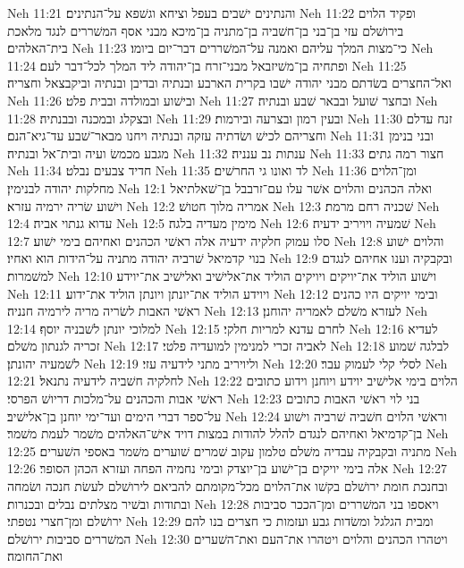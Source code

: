 Neh 11:21  והנתינים ישׁבים בעפל וציחא וגשׁפא על־הנתינים׃
Neh 11:22  ופקיד הלוים בירושׁלם עזי בן־בני בן־חשׁביה בן־מתניה בן־מיכא מבני אסף המשׁררים לנגד מלאכת בית־האלהים׃
Neh 11:23  כי־מצות המלך עליהם ואמנה על־המשׁררים דבר־יום ביומו׃
Neh 11:24  ופתחיה בן־משׁיזבאל מבני־זרח בן־יהודה ליד המלך לכל־דבר לעם׃
Neh 11:25  ואל־החצרים בשׂדתם מבני יהודה ישׁבו בקרית הארבע ובנתיה ובדיבן ובנתיה וביקבצאל וחצריה׃
Neh 11:26  ובישׁוע ובמולדה ובבית פלט׃
Neh 11:27  ובחצר שׁועל ובבאר שׁבע ובנתיה׃
Neh 11:28  ובצקלג ובמכנה ובבנתיה׃
Neh 11:29  ובעין רמון ובצרעה ובירמות׃
Neh 11:30  זנח עדלם וחצריהם לכישׁ ושׂדתיה עזקה ובנתיה ויחנו מבאר־שׁבע עד־גיא־הנם׃
Neh 11:31  ובני בנימן מגבע מכמשׂ ועיה ובית־אל ובנתיה׃
Neh 11:32  ענתות נב ענניה׃
Neh 11:33  חצור רמה גתים׃
Neh 11:34  חדיד צבעים נבלט׃
Neh 11:35  לד ואונו גי החרשׁים׃
Neh 11:36  ומן־הלוים מחלקות יהודה לבנימין׃
Neh 12:1  ואלה הכהנים והלוים אשׁר עלו עם־זרבבל בן־שׁאלתיאל וישׁוע שׂריה ירמיה עזרא׃
Neh 12:2  אמריה מלוך חטושׁ׃
Neh 12:3  שׁכניה רחם מרמת׃
Neh 12:4  עדוא גנתוי אביה׃
Neh 12:5  מימין מעדיה בלגה׃
Neh 12:6  שׁמעיה ויויריב ידעיה׃
Neh 12:7  סלו עמוק חלקיה ידעיה אלה ראשׁי הכהנים ואחיהם בימי ישׁוע׃
Neh 12:8  והלוים ישׁוע בנוי קדמיאל שׁרביה יהודה מתניה על־הידות הוא ואחיו׃
Neh 12:9  ובקבקיה וענו אחיהם לנגדם למשׁמרות׃
Neh 12:10  וישׁוע הוליד את־יויקים ויויקים הוליד את־אלישׁיב ואלישׁיב את־יוידע׃
Neh 12:11  ויוידע הוליד את־יונתן ויונתן הוליד את־ידוע׃
Neh 12:12  ובימי יויקים היו כהנים ראשׁי האבות לשׂריה מריה לירמיה חנניה׃
Neh 12:13  לעזרא משׁלם לאמריה יהוחנן׃
Neh 12:14  למלוכי יונתן לשׁבניה יוסף׃
Neh 12:15  לחרם עדנא למריות חלקי׃
Neh 12:16  לעדיא זכריה לגנתון משׁלם׃
Neh 12:17  לאביה זכרי למנימין למועדיה פלטי׃
Neh 12:18  לבלגה שׁמוע לשׁמעיה יהונתן׃
Neh 12:19  וליויריב מתני לידעיה עזי׃
Neh 12:20  לסלי קלי לעמוק עבר׃
Neh 12:21  לחלקיה חשׁביה לידעיה נתנאל׃
Neh 12:22  הלוים בימי אלישׁיב יוידע ויוחנן וידוע כתובים ראשׁי אבות והכהנים על־מלכות דריושׁ הפרסי׃
Neh 12:23  בני לוי ראשׁי האבות כתובים על־ספר דברי הימים ועד־ימי יוחנן בן־אלישׁיב׃
Neh 12:24  וראשׁי הלוים חשׁביה שׁרביה וישׁוע בן־קדמיאל ואחיהם לנגדם להלל להודות במצות דויד אישׁ־האלהים משׁמר לעמת משׁמר׃
Neh 12:25  מתניה ובקבקיה עבדיה משׁלם טלמון עקוב שׁמרים שׁוערים משׁמר באספי השׁערים׃
Neh 12:26  אלה בימי יויקים בן־ישׁוע בן־יוצדק ובימי נחמיה הפחה ועזרא הכהן הסופר׃
Neh 12:27  ובחנכת חומת ירושׁלם בקשׁו את־הלוים מכל־מקומתם להביאם לירושׁלם לעשׂת חנכה ושׂמחה ובתודות ובשׁיר מצלתים נבלים ובכנרות׃
Neh 12:28  ויאספו בני המשׁררים ומן־הככר סביבות ירושׁלם ומן־חצרי נטפתי׃
Neh 12:29  ומבית הגלגל ומשׂדות גבע ועזמות כי חצרים בנו להם המשׁררים סביבות ירושׁלם׃
Neh 12:30  ויטהרו הכהנים והלוים ויטהרו את־העם ואת־השׁערים ואת־החומה׃
